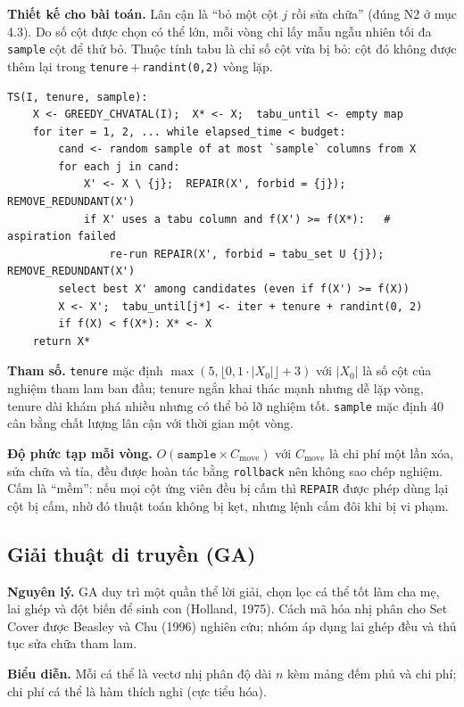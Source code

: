 \documentclass[a4paper,12pt]{article}
\begin{document}
\textbf{Thiết kế cho bài toán.} Lân cận là ``bỏ một cột $j$ rồi sửa chữa'' (đúng N2 ở mục 4.3). Do số cột được chọn có thể lớn, mỗi vòng chỉ lấy mẫu ngẫu nhiên tối đa \texttt{sample} cột để thử bỏ. Thuộc tính tabu là chỉ số cột vừa bị bỏ: cột đó không được thêm lại trong \texttt{tenure}\,$+\,$\texttt{randint(0,2)} vòng lặp.

\begin{Verbatim}
TS(I, tenure, sample):
    X <- GREEDY_CHVATAL(I);  X* <- X;  tabu_until <- empty map
    for iter = 1, 2, ... while elapsed_time < budget:
        cand <- random sample of at most `sample` columns from X
        for each j in cand:
            X' <- X \ {j};  REPAIR(X', forbid = {j});  REMOVE_REDUNDANT(X')
            if X' uses a tabu column and f(X') >= f(X*):   # aspiration failed
                re-run REPAIR(X', forbid = tabu_set U {j});  REMOVE_REDUNDANT(X')
        select best X' among candidates (even if f(X') >= f(X))
        X <- X';  tabu_until[j*] <- iter + tenure + randint(0, 2)
        if f(X) < f(X*): X* <- X
    return X*
\end{Verbatim}

\textbf{Tham số.} \texttt{tenure} mặc định $\max(5,\lfloor0{,}1\cdot|X_0|\rfloor+3)$ với $|X_0|$ là số cột của nghiệm tham lam ban đầu; tenure ngắn khai thác mạnh nhưng dễ lặp vòng, tenure dài khám phá nhiều nhưng có thể bỏ lỡ nghiệm tốt. \texttt{sample} mặc định 40 cân bằng chất lượng lân cận với thời gian một vòng.

\textbf{Độ phức tạp mỗi vòng.} $O(\texttt{sample}\times C_{\text{move}})$ với $C_{\text{move}}$ là chi phí một lần xóa, sửa chữa và tỉa, đều được hoàn tác bằng \texttt{rollback} nên không sao chép nghiệm. Cấm là ``mềm'': nếu mọi cột ứng viên đều bị cấm thì \texttt{REPAIR} được phép dùng lại cột bị cấm, nhờ đó thuật toán không bị kẹt, nhưng lệnh cấm đôi khi bị vi phạm.

\subsection{Giải thuật di truyền (GA)}
\textbf{Nguyên lý.} GA duy trì một quần thể lời giải, chọn lọc cá thể tốt làm cha mẹ, lai ghép và đột biến để sinh con (Holland, 1975). Cách mã hóa nhị phân cho Set Cover được Beasley và Chu (1996) nghiên cứu; nhóm áp dụng lai ghép đều và thủ tục sửa chữa tham lam.

\textbf{Biểu diễn.} Mỗi cá thể là vectơ nhị phân độ dài $n$ kèm mảng đếm phủ và chi phí; chi phí cá thể là hàm thích nghi (cực tiểu hóa).
\end{document}
